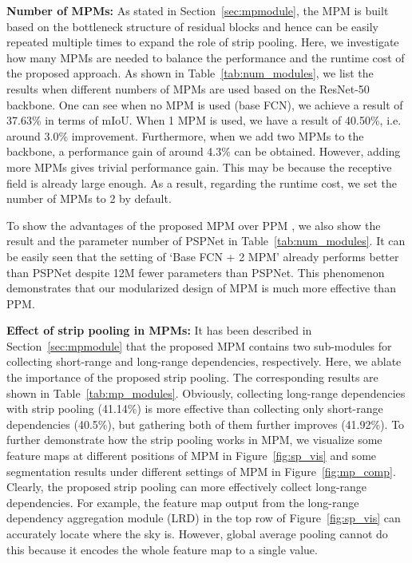 \documentclass[final]{cvpr}
\newcommand{\newparam}[1]{\vspace{5pt}\noindent\textbf{#1}}
\begin{document}
\newparam{Number of MPMs:}
As stated in Section~\ref{sec:mpmodule}, the MPM
is built based on the bottleneck structure of residual blocks \cite{He2016} 
and hence can be easily repeated multiple times to expand the role of strip pooling.
Here, we investigate how many MPMs are needed to balance the performance and the runtime cost of the proposed approach.
As shown in Table~\ref{tab:num_modules}, we list the results when different numbers of MPMs are used based on the ResNet-50 backbone.
One can see when no MPM is used (base FCN), 
we achieve a result of 37.63\% in terms of mIoU.
When 1 MPM is used, we have a result of 40.50\%,
i.e. around 3.0\% improvement.
Furthermore, when we add two MPMs to the backbone, 
a performance gain of around 4.3\% can be obtained.
However, adding more MPMs gives trivial performance gain.
This may be because the receptive field is already large enough. 
As a result, regarding the runtime cost, 
we set the number of MPMs to 2 by default.

To show the advantages of the proposed MPM 
over PPM \cite{zhao2016pyramid}, we also
show the result and the parameter number of 
PSPNet in Table~\ref{tab:num_modules}.
It can be easily seen that the setting of 
`Base FCN + 2 MPM' already performs better 
than PSPNet despite 12M fewer parameters than PSPNet.
This phenomenon demonstrates that our modularized design of MPM is much more effective than PPM.



\newparam{Effect of strip pooling in MPMs:}
It has been described in Section~\ref{sec:mpmodule} that the proposed MPM contains two sub-modules for 
collecting short-range and long-range dependencies, respectively.
Here, we ablate the importance of the proposed strip pooling.
The corresponding results are shown in
Table~\ref{tab:mp_modules}.
Obviously, collecting long-range dependencies with strip pooling (41.14\%) is more effective than collecting only short-range dependencies (40.5\%),
but gathering both of them further improves (41.92\%).
To further demonstrate how the strip pooling works in MPM,
we visualize some feature maps at different positions of MPM in Figure~\ref{fig:sp_vis} and some segmentation results under different settings of MPM in Figure~\ref{fig:mp_comp}.
Clearly, the proposed strip pooling can more effectively collect long-range dependencies.
For example, the feature map output from the long-range dependency aggregation module (LRD) in the top row of Figure~\ref{fig:sp_vis}
can accurately locate where the sky is.
However, global average pooling cannot do this
because it encodes the whole feature map to 
a single value.
\end{document}
